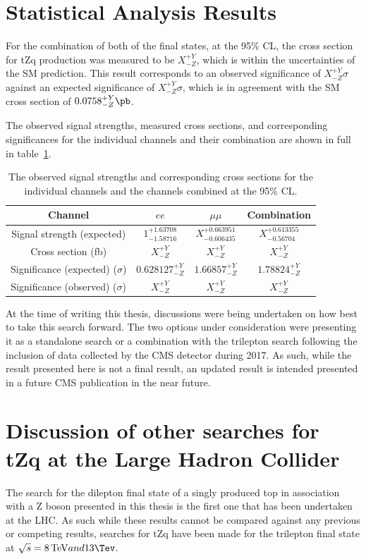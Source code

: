 \section{Statistical Analysis Results}
For the combination of both of the final states, at the 95\% CL, the cross section for tZq production was measured to be $X^{+Y}_{-Z}$, which is within the uncertainties of the SM prediction.
This result corresponds to an observed significance of $X_{-Z}^{+Y} \sigma$ against an expected significance of $X_{-Z}^{+Y} \sigma$, which is in agreement with the SM cross section of  $0.0758^{+Y}_{-Z} \pb$.

The observed signal strengths, measured cross sections, and corresponding significances for the individual channels and their combination are shown in full in table~\ref{tab:shapetxs}.

\begin{table}[!h]
   \centering
   \caption{The observed signal strengths and corresponding cross sections for
   the individual channels and the channels combined at the 95\% CL.}
   \begin{tabular}{cccc}
       \hline
       Channel & $ee$ & $\mu\mu$ & \textbf{Combination} \\
        \hline
       Signal strength (expected) & $1_{-1.58716}^{+1.63708}$ & $X_{-0.606435}^{+0.663951}$ & $X_{-0.56704}^{+0.613355}$ \\
       Cross section (fb) & $X_{-Z}^{+Y}$ & $X_{-Z}^{+Y}$ & $X_{-Z}^{+Y}$ \\
       Significance (expected) ($\sigma$) & $0.628127_{-Z}^{+Y}$ & $1.66857_{-Z}^{+Y}$ & $1.78824_{-Z}^{+Y}$ \\
       Significance (observed) ($\sigma$) & $X_{-Z}^{+Y}$ & $X_{-Z}^{+Y}$ & $X_{-Z}^{+Y}$ \\
    \end{tabular}
   \label{tab:shapetxs}
\end{table}

At the time of writing this thesis, discussions were being undertaken on how best to take this search forward.
The two options under consideration were presenting it as a standalone search or a combination with the trilepton search following the inclusion of data collected by the CMS detector during 2017.
As such, while the result presented here is not a final result, an updated result is intended presented in a future CMS publication in the near future.

\section{Discussion of other searches for tZq at the Large Hadron Collider}
The search for the dilepton final state of a singly produced top in association with a Z boson presented in this thesis is the first one that has been undertaken at the LHC.
As such while these results cannot be compared against any previous or competing results, searches for tZq have been made for the trilepton final state at $\sqrt{s} = 8 \TeV and 13 \Tev$.


